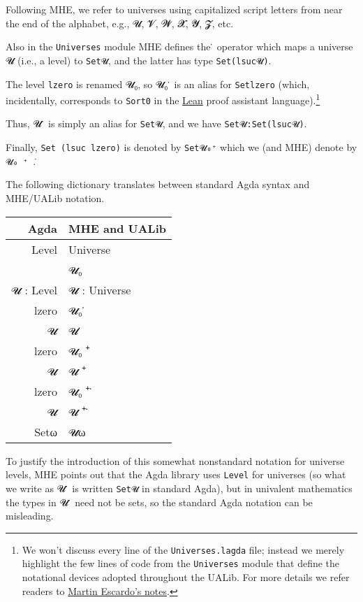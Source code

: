 \begin{code}
Following MHE, we refer to universes using capitalized script letters from near the end of the alphabet, e.g., 𝓤, 𝓥, 𝓦, 𝓧, 𝓨, 𝓩, etc.

Also in the \texttt{Universes} module MHE defines the ̇ operator which maps a universe 𝓤 (i.e., a level) to \texttt{Set𝓤}, and the latter has type \texttt{Set(lsuc𝓤)}.

The level \texttt{lzero} is renamed 𝓤₀, so 𝓤₀ ̇ is an alias for \texttt{Setlzero} (which, incidentally, corresponds to \texttt{Sort0} in the \href{}{Lean} proof assistant language).\footnote{We won't discuss every line of the \texttt{Universes.lagda} file; instead we merely highlight the few lines of code from the \texttt{Universes} module that define the notational devices adopted throughout the UALib. For more details we refer readers to \href{https://www.cs.bham.ac.uk/~mhe/HoTT-UF-in-Agda-Lecture-Notes}{Martin Escardo's notes}.}

Thus, 𝓤 ̇ is simply an alias for \texttt{Set𝓤}, and we have
\texttt{Set𝓤:Set(lsuc𝓤)}.

Finally, \texttt{Set~(lsuc~lzero)} is denoted by \texttt{Set𝓤₀⁺} which we (and MHE) denote by \texttt{𝓤₀~⁺~̇}.

The following dictionary translates between standard Agda syntax and
MHE/UALib notation.

\begin{tabular}{r|l}
Agda    &          MHE and UALib \\
\hline
Level   &          Universe\\
\lzero    &         𝓤₀\\
𝓤 : Level   & 𝓤 : Universe\\
\DataTypeTok{Set}\sP{3}lzero  &       𝓤₀ ̇\\
\DataTypeTok{Set}\sP{3}𝓤   &          𝓤 ̇ \\
\lsuc lzero    &    𝓤₀ ⁺\\
\lsuc 𝓤        &    𝓤 ⁺\\
\DataTypeTok{Set} \OtherTok{(} \lsuc lzero \OtherTok{)} \sP{3} & 𝓤₀ ⁺ ̇\\
\DataTypeTok{Set} \OtherTok{(} \lsuc 𝓤 \OtherTok{)} \sP{3} &    𝓤 ⁺ ̇\\
Setω     &         𝓤ω
\end{tabular}

To justify the introduction of this somewhat nonstandard notation for universe levels, MHE points out that the Agda library uses \texttt{Level} for universes (so what we write as 𝓤 ̇ is written \texttt{Set𝓤} in standard Agda), but in univalent mathematics the types in 𝓤 ̇ need not be sets, so the standard Agda notation can be misleading.


\end{code}
